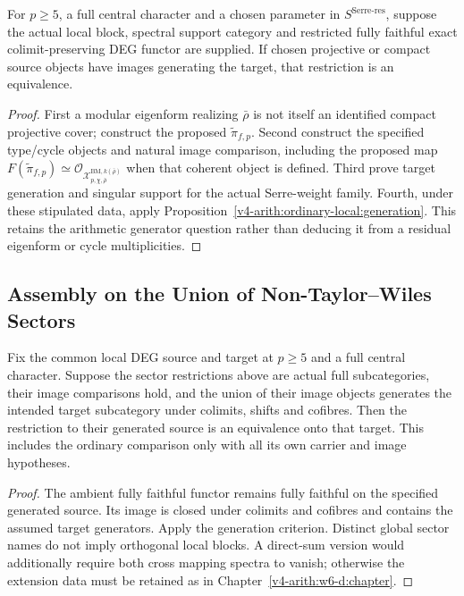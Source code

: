 \begin{theorem}
\label{v4-arith:w6-e:thm:TW-removal-Serre}
For $p\ge5$, a full central character and a chosen parameter in
$S^{\mathrm{Serre\text{-}res}}$, suppose the actual local block,
spectral support category and restricted fully faithful exact
colimit-preserving DEG functor are supplied. If chosen projective
or compact source objects have images generating the target,
that restriction is an equivalence.
\end{theorem}
\begin{proof}
First a modular eigenform realizing $\bar\rho$ is not itself an
identified compact projective cover; construct the proposed
$\widetilde\pi_{f,p}$. Second construct the specified type/cycle
objects and natural image comparison, including the proposed map
$F(\widetilde\pi_{f,p})\simeq
\mathcal O_{\mathcal X^{\mathrm{BM},k(\bar\rho)}_{p,\chi,\bar\rho}}$
when that coherent object is defined. Third prove target generation
and singular support for the actual Serre-weight family. Fourth,
under these stipulated data, apply
Proposition~\ref{v4-arith:ordinary-local:generation}. This retains
the arithmetic generator question rather than deducing it from
a residual eigenform or cycle multiplicities.
\end{proof}

\subsection{Assembly on the Union of Non-Taylor--Wiles Sectors}

\begin{theorem}
\label{v4-arith:w6-e:thm:TW-removal-union}
Fix the common local DEG source and target at $p\ge5$ and a full
central character. Suppose the sector restrictions above are actual
full subcategories, their image comparisons hold, and the union of
their image objects generates the intended target subcategory under
colimits, shifts and cofibres. Then the restriction to their generated
source is an equivalence onto that target. This includes the ordinary
comparison only with all its own carrier and image hypotheses.
\end{theorem}
\begin{proof}
The ambient fully faithful functor remains fully faithful on the
specified generated source. Its image is closed under colimits and
cofibres and contains the assumed target generators. Apply the
generation criterion. Distinct global sector names do not imply
orthogonal local blocks. A direct-sum version would additionally
require both cross mapping spectra to vanish; otherwise the
extension data must be retained as in Chapter~\ref{v4-arith:w6-d:chapter}.
\end{proof}

